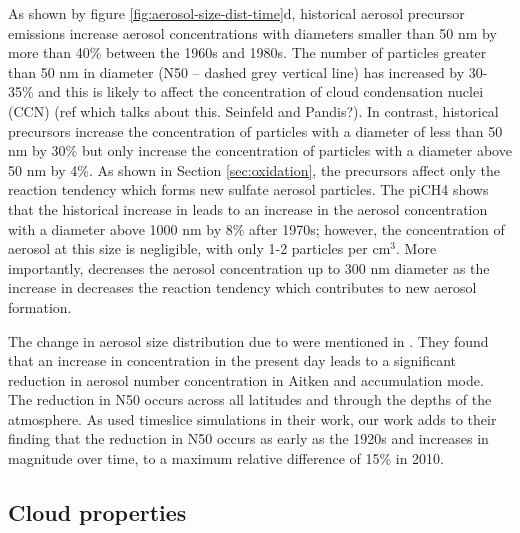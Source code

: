 As shown by figure \ref{fig:aerosol-size-dist-time}d, historical aerosol precursor emissions increase aerosol concentrations with diameters smaller than 50 nm by more than 40\%  between the 1960s and 1980s. The number of particles greater than 50 nm in diameter (N50 -- dashed grey vertical line) has increased by 30-35\% and this is likely to affect the concentration of cloud condensation nuclei (CCN) (ref which talks about this. Seinfeld and Pandis?). In contrast, historical  precursors increase the concentration of particles with a diameter of less than 50 nm by 30\% but only increase the concentration of particles with a diameter above 50 nm by 4\%. As shown in Section \ref{sec:oxidation}, the  precursors affect only the  reaction tendency which forms new sulfate aerosol particles. The piCH4 shows that the historical increase in  leads to an increase in the aerosol concentration with a diameter above 1000 nm by 8\% after 1970s; however, the concentration of aerosol at this size is negligible, with only 1-2 particles per cm${^3}$. More importantly,  decreases the aerosol concentration up to 300 nm diameter as the increase in  decreases the  reaction tendency which contributes to new aerosol formation. 

The change in aerosol size distribution due to  were mentioned in \citep{oconnorApportionmentPreIndustrial2022}. They found that an increase in  concentration in the present day leads to a significant reduction in aerosol number concentration in Aitken and accumulation mode. The reduction in N50 occurs across all latitudes and through the depths of the atmosphere. As \citet{oconnorApportionmentPreIndustrial2022} used timeslice simulations in their work, our work adds to their finding that the reduction in N50 occurs as early as the 1920s and increases in magnitude over time, to a maximum relative difference of 15\% in 2010. 

\subsection{Cloud properties}

